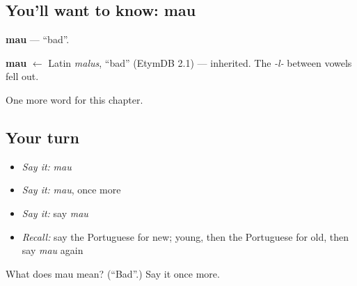 \subsection*{You'll want to know: mau}
\textbf{mau} — \textquotedblleft{}bad\textquotedblright{}.

\begin{cousinweb}
\textbf{mau} $\leftarrow$ Latin \emph{malus}, \textquotedblleft{}bad\textquotedblright{} (EtymDB 2.1) — inherited. The \emph{-l-} between vowels fell out.
\end{cousinweb}

\begin{grammarlens}[title={What you've built}]
One more word for this chapter.
\end{grammarlens}

\subsection*{Your turn}
\begin{itemize}
\raggedright
  \item \emph{Say it:} \emph{mau}
  \item \emph{Say it:} \emph{mau}, once more
  \item \emph{Say it:} say \emph{mau}
  \item \emph{Recall:} say the Portuguese for new; young, then the Portuguese for old, then say \emph{mau} again
\end{itemize}

\begin{tcolorbox}[breakable,colback=teal!4,colframe=teal!35!black,title={Before you move on}]
What does mau mean? (\textquotedblleft{}Bad\textquotedblright{}.) Say it once more.
\end{tcolorbox}
